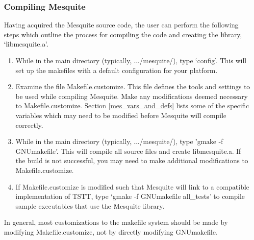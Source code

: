 \subsubsection{Compiling Mesquite}
Having acquired the Mesquite source code, the user can perform the
following steps which outline the process for compiling the code and
creating the library, `libmesquite.a'.
\begin{enumerate}

\item While in the main directory (typically, .../mesquite/), type
`config'.  This will set up the makefiles with a default configuration
for your platform.

\item Examine the file Makefile.customize.  This file defines
the tools and settings to be used while compiling Mesquite.  Make
any modifications deemed necessary to Makefile.customize.  Section
\ref{mes_vars_and_defs} lists some of the specific variables which
may need to be modified before Mesquite will compile correctly.

\item While in the main directory (typically, .../mesquite/),
type 'gmake -f GNUmakefile'.  This will compile all source files
and create libmesquite.a.  If the build is not successful, you may need
to make additional modifications to Makefile.customize.

\item If Makefile.customize is modified such that Mesquite will
link to a compatible implementation of TSTT, type `gmake -f GNUmakefile
all\_tests' to compile sample executables that use the Mesquite
library.

\end{enumerate}
In general, most customizations to the makefile system should be
made by modifying Makefile.customize, not by directly modifying
GNUmakefile.
